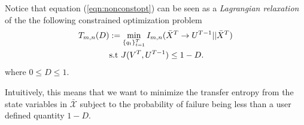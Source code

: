Notice that equation (\ref{eqn:nonconstopt}) can be seen as a \emph{Lagrangian relaxation} of the the following constrained optimization problem
\begin{align}\label{eqn:constopt}
T_{m,n}(D) & := \min_{\{q_t\}_{t=1}^T} I_{m,n}(\bar{X}^T \rightarrow U^{T-1}||\bar{X}^T) \\
& \textrm{s.t } J(V^{T},U^{T-1}) \leq 1 - D. \nonumber
\end{align}
where $0\leq D \leq 1$.

Intuitively, this means that we want to minimize the transfer entropy from the state variables in $\mathcal{\bar{X}}$ subject to the probability of failure being less than a user defined quantity $1-D$.


